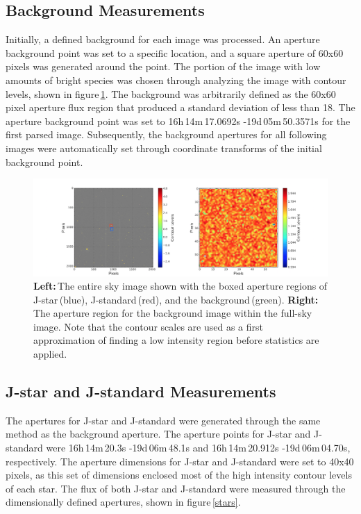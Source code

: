 \documentclass[onecolumn]{aastex6}
\begin{document}
\subsection{Background Measurements}
Initially, a defined background for each image was processed. An aperture background point was set to a specific location, and a square aperture of 60x60 pixels was generated around the point. The portion of the image with low amounts of bright species was chosen through analyzing the image with contour levels, shown in figure\,\ref{background}. The background was arbitrarily defined as the 60x60 pixel aperture flux region that produced a standard deviation of less than 18. The aperture background point was set to 16h\,14m\,17.0692s -19d\,05m\,50.3571s for the first parsed image. Subsequently, the background apertures for all following images were automatically set through coordinate transforms of the initial background point.

\begin{figure}[ht]
  \centering
  \includegraphics[scale=0.4]{background_v6.png}%
  \caption{\textbf{Left:}\,The entire sky image shown with the boxed aperture regions of J-star\,(blue), J-standard\,(red), and the background\,(green). \textbf{Right:}\,The aperture region for the background image within the full-sky image. Note that the contour scales are used as a first approximation of finding a low intensity region before statistics are applied.}
  \label{background}
\end{figure}

\subsection{J-star and J-standard Measurements}

The apertures for J-star and J-standard were generated through the same method as the background aperture. The aperture points for J-star and J-standard were 16h\,14m\,20.3s -19d\,06m\,48.1s and 16h\,14m\,20.912s -19d\,06m\,04.70s, respectively. The aperture dimensions for J-star and J-standard were set to 40x40 pixels, as this set of dimensions enclosed most of the high intensity contour levels of each star. The flux of both J-star and J-standard were measured through the dimensionally defined apertures, shown in figure\,\ref{stars}.
\end{document}
